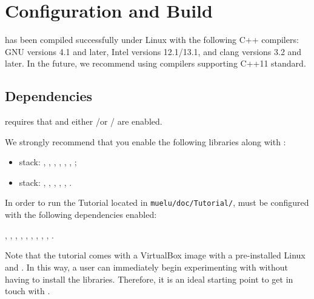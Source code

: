 \section{Configuration and Build}
\label{sec:configuration and build}

\muelu{} has been compiled successfully under Linux with the following C++
compilers: GNU versions 4.1 and later, Intel versions 12.1/13.1, and clang versions 3.2 and later.
In the future, we recommend using compilers supporting C++11 standard.

\subsection{Dependencies}


\muelu{} requires that \teuchos{} and either \epetra/\ifpack or \tpetra/\ifpacktwo
are enabled.


We strongly recommend that you enable the following \trilinos libraries along with \muelu:

\begin{itemize}
  \item \epetra stack: \aztecoo, \epetra, \amesos, \ifpack, \isorropia, \galeri,
    \zoltan;
  \item \tpetra stack: \amesostwo, \belos, \galeri, \ifpacktwo, \tpetra,
    \zoltantwo.
\end{itemize}


In order to run the \muelu{} Tutorial \cite{MueLuTutorial} located in \verb!muelu/doc/Tutorial/!, \muelu{} must be configured with the following
dependencies enabled:

  \amesostwo, \belos, \ifpack, \ifpacktwo, \isorropia, \galeri, \tpetra, \xpetra, \zoltan, \zoltantwo.

\begin{mycomment}
Note that the \muelu{} tutorial \cite{MueLuTutorial} comes with a VirtualBox image with a pre-installed
Linux and \trilinos{}.   In this way, a user can immediately begin experimenting with \muelu{} without
having to install the \trilinos{} libraries. Therefore, it is an ideal starting point to get in touch with \muelu{}.
\end{mycomment}



